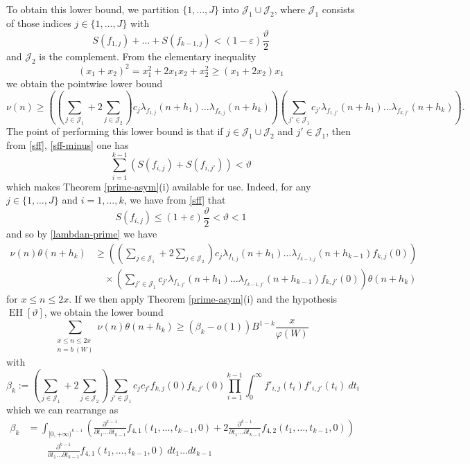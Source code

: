 \documentclass{bmcart}
\DeclareMathOperator*\EH{EH}
\theoremstyle{plain}
\theoremstyle{definition}
\newcommand\eps{\varepsilon}
\renewcommand{\phi}{\varphi}
\begin{document}
To obtain this lower bound, we partition $\{1,\dots,J\}$ into ${\mathcal J}_1 \cup {\mathcal J}_2$, where ${\mathcal J}_1$ consists of those indices $j \in \{1,\dots,J\}$ with
\begin{equation}\label{sff-minus}
S(f_{1,j}) + \dots + S(f_{k-1,j}) < (1-\eps) \frac{\vartheta}{2}
\end{equation}
and ${\mathcal J}_2$ is the complement.  From the elementary inequality
$$ (x_1 + x_2)^2 = x_1^2 + 2x_1 x_2 + x_2^2 \geq (x_1+2x_2) x_1 $$
we obtain the pointwise lower bound
$$ \nu(n) \geq 
\left( (\sum_{j \in {\mathcal J}_1} + 2 \sum_{j \in {\mathcal J}_2}) c_j \lambda_{f_{1,j}}(n+h_1) \dots \lambda_{f_{k,j}}(n+h_k) \right)
\left( \sum_{j' \in {\mathcal J}_1} c_{j'} \lambda_{f_{1,j'}}(n+h_1) \dots \lambda_{f_{k,j'}}(n+h_k) \right).$$
The point of performing this lower bound is that if $j \in {\mathcal J}_1 \cup {\mathcal J}_2$ and $j' \in {\mathcal J}_1$, then from \eqref{sff}, \eqref{sff-minus} one has
$$ \sum_{i=1}^{k-1} (S(f_{i,j}) + S(f_{i,j'})) < \vartheta$$
which makes Theorem \ref{prime-asym}(i) available for use.  Indeed, for any $j \in \{1,\dots,J\}$ and $i=1,\dots,k$, we have from \eqref{sff} that
$$ S(f_{i,j}) \leq (1+\eps) \frac{\vartheta}{2} < \vartheta < 1$$
and so by \eqref{lambdan-prime} we have
\begin{equation}\label{nutheta}
\begin{split}
 \nu(n) \theta(n+h_k) &\geq 
\left( (\sum_{j \in {\mathcal J}_1} + 2 \sum_{j \in {\mathcal J}_2}) c_j \lambda_{f_{1,j}}(n+h_1) \dots \lambda_{f_{k-1,j}}(n+h_{k-1}) f_{k,j}(0) \right)\\
&\quad \times \left( \sum_{j' \in {\mathcal J}_1} c_{j'} \lambda_{f_{1,j'}}(n+h_1) \dots \lambda_{f_{k-1,j'}}(n+h_{k-1}) f_{k,j'}(0) \right) \theta(n+h_k)
\end{split}
\end{equation}
for $x \leq n \leq 2x$.  If we then apply Theorem \ref{prime-asym}(i) and the hypothesis $\EH[\vartheta]$, we obtain the lower bound
$$ 
 \sum_{\substack{x \leq n \leq 2x\\ n = b\ (W)}} \nu(n) \theta(n+h_k) \geq (\beta_k - o(1)) B^{1-k} \frac{x}{\phi(W)}$$
with
$$ \beta_k :=
(\sum_{j \in {\mathcal J}_1} + 2 \sum_{j \in {\mathcal J}_2}) \sum_{j' \in {\mathcal J}_1} c_j c_{j'} f_{k,j}(0) f_{k,j'}(0)
\prod_{i=1}^{k-1} \int_0^\infty f'_{i,j}(t_i) f'_{i,j'}(t_i)\ dt_i $$
which we can rearrange as
\begin{align*}
\beta_k &= \int_{[0,+\infty)^{k-1}} \left(\frac{\partial^{k-1}}{\partial t_1 \dots \partial t_{k-1}} f_{4,1}(t_1,\dots,t_{k-1},0) + 2\frac{\partial^{k-1}}{\partial t_1 \dots \partial t_{k-1}} f_{4,2}(t_1,\dots,t_{k-1},0)\right)\\
&\quad\quad  \frac{\partial^{k-1}}{\partial t_1 \dots \partial t_{k-1}} f_{4,1}(t_1,\dots,t_{k-1},0)\ dt_1 \dots dt_{k-1} 
\end{align*}
\end{document}
